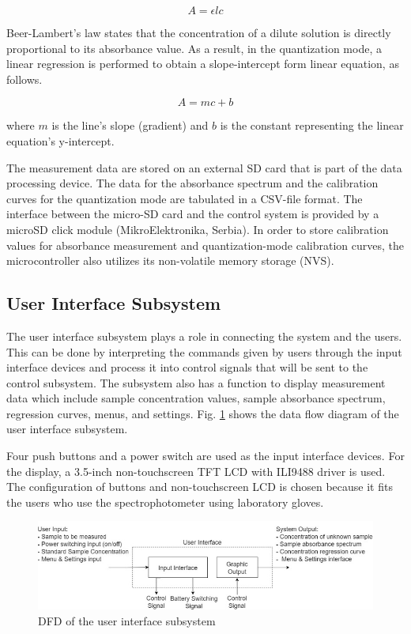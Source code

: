 \documentclass[conference]{IEEEtran}
\begin{document}
    \begin{equation}
    A={\epsilon}{l}{c}
    \label{beer-lambert}
    \end{equation}

Beer-Lambert's law states that the concentration of a dilute solution is directly proportional to its absorbance value.
As a result, in the quantization mode, a linear regression is performed to obtain a slope-intercept form linear equation, as follows. 

    \begin{equation}
    A={m}{c}+{b}
    \label{linear-eq}
    \end{equation}

where $m$ is the line's slope (gradient) and $b$ is the constant representing the linear equation's y-intercept.

The measurement data are stored on an external SD card that is part of the data processing device.
The data for the absorbance spectrum and the calibration curves for the quantization mode are tabulated in a CSV-file format.
The interface between the micro-SD card and the control system is provided by a microSD click module (MikroElektronika, Serbia).
In order to store calibration values for absorbance measurement and quantization-mode calibration curves, the microcontroller also utilizes its non-volatile memory storage (NVS).

\subsection{User Interface Subsystem}
The user interface subsystem plays a role in connecting the system and the users.
This can be done by interpreting the commands given by users through the input interface devices and process it into control signals that will be sent to the control subsystem.
The subsystem also has a function to display measurement data which include sample concentration values, sample absorbance spectrum, regression curves, menus, and settings.
Fig. \ref{ui-dfd} shows the data flow diagram of the user interface subsystem.

Four push buttons and a power switch are used as the input interface devices.
For the display, a 3.5-inch non-touchscreen TFT LCD with ILI9488 driver is used.
The configuration of buttons and non-touchscreen LCD is chosen because it fits the users who use the spectrophotometer using laboratory gloves.

    \begin{figure}[htbp]
    \centerline{\includegraphics[scale=0.43]{ui-dfd.png}}
    \caption{DFD of the user interface subsystem}
    \label{ui-dfd}
    \end{figure}
\end{document}
